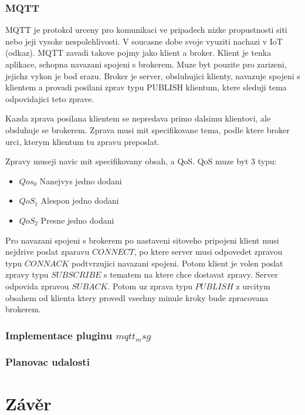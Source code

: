 \subsection*{MQTT}
MQTT je protokol urceny pro komunikaci ve pripadech nizke propustnosti siti nebo jeji vysoke nespolehlivosti. V soucasne dobe svoje vyuziti nachazi v IoT (odkaz). MQTT zavadi takove pojmy jako klient a broker. Klient je tenka aplikace, schopna navazani spojeni s brokerem. Muze byt pouzite pro zarizeni, jejichz vykon je bod srazu. Broker je server, obsluhujici klienty, navazuje spojeni s klientem a provadi posilani zprav typu PUBLISH klientum, ktere sleduji tema odpovidajici teto zprave.

Kazda zprava posilana klientem se nepredava primo dalsimu klientovi, ale obsluhuje se brokerem. Zprava musi mit specifikovane tema, podle ktere broker urci, kterym klientum tu zpravu preposlat.

Zpravy museji navic mit specifikovany obsah, a QoS. QoS muze byt 3 typu:
\begin{itemize}
  \item $Qos_0$ Nanejvys jedno dodani \\
  \item $QoS_1$ Alespon jedno dodani \\
  \item $QoS_2$ Presne jedno dodani 
\end{itemize}

Pro navazani spojeni s brokerem po nastaveni sitoveho pripojeni klient musi nejdrive poslat zparavu $CONNECT$, po ktere server musi odpovedet zpravou typu $CONNACK$ podtvrzujici navazani spojeni. Potom klient je volen poslat zpravy typu $SUBSCRIBE$ s tematem na ktere chce dostavat zpravy. Server odpovida zpravou $SUBACK$. Potom uz zprava typu $PUBLISH$ z urcitym obsahem od klienta ktery provedl vsechny minule kroky bude zpracovana brokerem.
\subsection*{Implementace pluginu $mqtt_msg$}


\subsection*{Planovac udalosti}
\chapter{Závěr}
\label{zaver}
